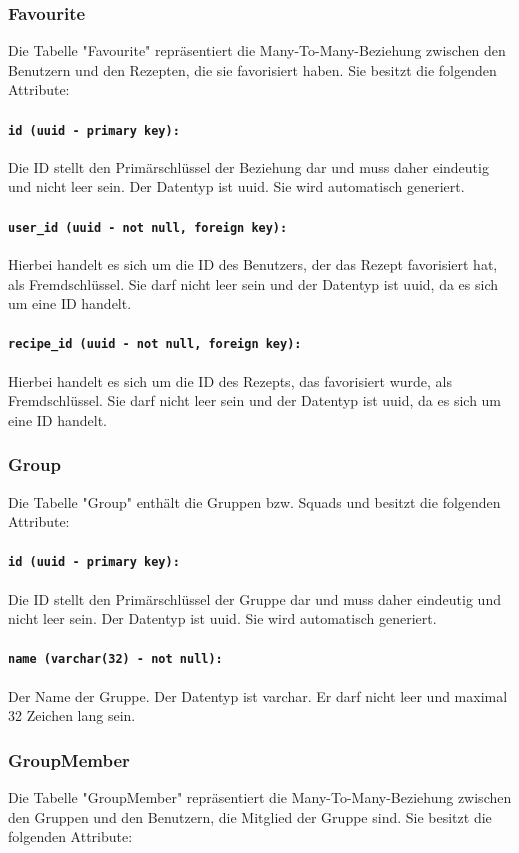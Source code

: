 \documentclass{entwurfsheft}
\begin{document}
\subsubsection{Favourite}
Die Tabelle "Favourite" repräsentiert die Many-To-Many-Beziehung zwischen den Benutzern und den Rezepten, die sie favorisiert haben. Sie besitzt die folgenden Attribute:
\paragraph{\texttt{id (uuid - primary key):}} Die ID stellt den Primärschlüssel der Beziehung dar und muss daher eindeutig und nicht leer sein. Der Datentyp ist \Gls{uuid}. Sie wird automatisch generiert.
\paragraph{\texttt{user\_id (uuid - not null, foreign key):}} Hierbei handelt es sich um die ID des Benutzers, der das Rezept favorisiert hat, als Fremdschlüssel. Sie darf nicht leer sein und der Datentyp ist \Gls{uuid}, da es sich um eine ID handelt.
\paragraph{\texttt{recipe\_id (uuid - not null, foreign key):}} Hierbei handelt es sich um die ID des Rezepts, das favorisiert wurde, als Fremdschlüssel. Sie darf nicht leer sein und der Datentyp ist \Gls{uuid}, da es sich um eine ID handelt.
\newpage
\subsubsection{Group}
Die Tabelle "Group" enthält die Gruppen bzw. Squads und besitzt die folgenden Attribute:
\paragraph{\texttt{id (uuid - primary key):}} Die ID stellt den Primärschlüssel der Gruppe dar und muss daher eindeutig und nicht leer sein. Der Datentyp ist \Gls{uuid}. Sie wird automatisch generiert.
\paragraph{\texttt{name (varchar(32) - not null):}} Der Name der Gruppe. Der Datentyp ist \Gls{varchar}. Er darf nicht leer und maximal 32 Zeichen lang sein.
\newpage
\subsubsection{GroupMember}
Die Tabelle "GroupMember" repräsentiert die Many-To-Many-Beziehung zwischen den Gruppen und den Benutzern, die Mitglied der Gruppe sind. Sie besitzt die folgenden Attribute:
\end{document}

